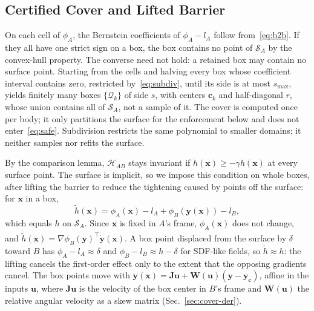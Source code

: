 \documentclass[journal]{IEEEtran}
\theoremstyle{definition}
\begin{document}
\subsection{Certified Cover and Lifted Barrier}
On each cell of $\phi_A$, the Bernstein coefficients of $\phi_A-l_A$ follow from~\eqref{eq:b2b}. If
they all have one strict sign on a box, the box contains no point of $\mathcal S_A$ by the
convex-hull property. The converse need not hold: a retained box may contain no surface point.
Starting from the cells and halving every box whose coefficient interval contains zero,
restricted by~\eqref{eq:subdiv}, until its side is at most $s_{\max}$, yields finitely many boxes
$\{\mathcal Q_k\}$ of side $s$, with centers $\mathbf c_k$ and half-diagonal $r$, whose union contains
all of $\mathcal S_A$, not a sample of it. The cover is computed once per body; it only partitions
the surface for the enforcement below and does not enter~\eqref{eq:safe}. Subdivision restricts the
same polynomial to smaller domains; it neither samples nor refits the surface.

By the comparison lemma, $\mathcal H_{AB}$ stays invariant if $\dot h(\mathbf x)\ge-\gamma h(\mathbf x)$
at every surface point. The surface is implicit, so we impose this condition on whole boxes, after
lifting the barrier to reduce the tightening caused by points off the surface: for $\mathbf x$ in a
box,
\begin{equation}\label{eq:lift}
\tilde h(\mathbf x)=\phi_A(\mathbf x)-l_A+\phi_B(\mathbf y(\mathbf x))-l_B ,
\end{equation}
which equals $h$ on $\mathcal S_A$. Since $\mathbf x$ is fixed in $A$'s frame, $\phi_A(\mathbf x)$ does
not change, and $\dot{\tilde h}(\mathbf x)=\nabla\phi_B(\mathbf y)^\top\dot{\mathbf y}(\mathbf x)$. A
box point displaced from the surface by $\delta$ toward $B$ has $\phi_A-l_A\approx\delta$ and
$\phi_B-l_B\approx h-\delta$ for SDF-like fields, so $\tilde h\approx h$: the lifting cancels the
first-order effect only to the extent that the opposing gradients cancel. The box points move with
$\dot{\mathbf y}(\mathbf x)=\mathbf J\mathbf u+\mathbf W(\mathbf u)(\mathbf y-\mathbf y_{\mathbf c})$,
affine in the inputs $\mathbf u$, where $\mathbf J\mathbf u$ is the velocity of the box center in
$B$'s frame and $\mathbf W(\mathbf u)$ the relative angular velocity as a skew matrix
(Sec.~\ref{sec:cover-der}).
\end{document}
